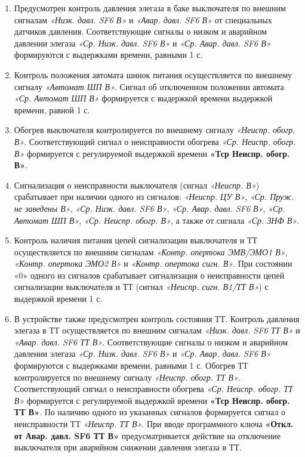 \documentclass[a4paper, 12pt, table, hidelinks, DIV=calc]{extarticle}
\begin{document}
\begin{enumerate}[label=\arabic{section}.\arabic{subsection}.\arabic{enumi}, labelsep=4pt, leftmargin=0pt, itemindent=57pt, itemsep=0pt, parsep=0pt]
\item
Предусмотрен контроль давления элегаза в баке выключателя по внешним сигналам \textit{«Низк. давл. SF6 В»} и \textit{«Авар. давл. SF6 В»} от специальных датчиков давления. Соответствующие сигналы о низком и аварийном давлении элегаза \textit{«Ср. Низк. давл. SF6 В»} и \textit{«Ср. Авар. давл. SF6 В»} формируются с выдержками времени, равными 1 с.

\item
Контроль положения автомата шинок питания осуществляется по внешнему сигналу \textit{«Автомат ШП В»}. Сигнал об отключенном положении автомата \textit{«Ср. Автомат ШП В»} формируется с выдержкой времени выдержкой времени, равной 1 с. 

\item
Обогрев выключателя контролируется по внешнему сигналу \textit{«Неиспр. обогр. В»}. Соответствующий сигнал о неисправности обогрева \textit{«Ср. Неиспр. обогр. В»} формируется с регулируемой выдержкой времени \textbf{«Тср Неиспр. обогр. В»}.

\item
Сигнализация о неисправности выключателя (сигнал \textit{«Неиспр. В»}) срабатывает при наличии одного из сигналов: \textit{«Неиспр. ЦУ В»}, \textit{«Ср. Пруж. не заведены В»}, \textit{«Ср. Низк. давл. SF6 В»}, \textit{«Ср. Авар. давл. SF6 В»}, \textit{«Ср. Автомат ШП В»}, \textit{«Ср. Неиспр. обогр. В»}, а также от сигнала \textit{«Ср. ЗНФ В»}.

\item
Контроль наличия питания цепей сигнализации выключателя и ТТ осуществляется по внешним сигналам \textit{«Контр. опертока ЭМВ/ЭМО1 В»}, \textit{«Контр. опертока ЭМО2 В»} и \textit{«Контр. опертока сигн. В»}. При состоянии «0» одного из сигналов срабатывает сигнализация о неисправности цепей сигнализации выключателя и ТТ (сигнал \textit{«Неиспр. сигн. В1/ТТ В»}) с выдержкой времени 1 с. 



\item
В устройстве также предусмотрен контроль состояния ТТ. Контроль давления элегаза в ТТ осуществляется по внешним сигналам \textit{«Низк. давл. SF6 ТТ В»} и \textit{«Авар. давл. SF6 ТТ В»}. Соответствующие сигналы о низком и аварийном давлении элегаза \textit{«Ср. Низк. давл. SF6 В»} и \textit{«Ср. Авар. давл. SF6 В»} формируются с выдержками времени, равными 1 с. Обогрев ТТ контролируется по внешнему сигналу \textit{«Неиспр. обогр. ТТ В»}. Соответствующий сигнал о неисправности обогрева \textit{«Ср. Неиспр. обогр. ТТ В»}
формируется с регулируемой выдержкой времени \textbf{«Тср Неиспр. обогр. ТТ В»}. По наличию одного из указанных сигналов формируется сигнал о неисправности ТТ \textit{«Неиспр. ТТ В»}. При вводе программного ключа \textbf{«Откл. от Авар. давл. SF6 ТТ В»} предусматривается действие на отключение выключателя при аварийном снижении давления элегаза в ТТ.


\end{enumerate}
\end{document}
